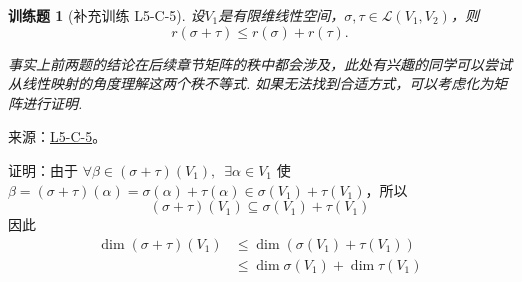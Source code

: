 \documentclass[UTF8,12pt,a4paper,fontset=fandol]{ctexart}
\newtheorem{exercise}{训练题}[section]
\begin{document}
\begin{exercise}[补充训练 L5-C-5]\label{prob:L5-C-5}
设$V_1$是有限维线性空间，$\sigma,\tau\in \mathcal{L}(V_1,V_2)$，则
        \[r(\sigma+\tau) \leqslant r(\sigma)+r(\tau).\]

        事实上前两题的结论在后续章节矩阵的秩中都会涉及，此处有兴趣的同学可以尝试从线性映射的角度理解这两个秩不等式. 如果无法找到合适方式，可以考虑化为矩阵进行证明.
\end{exercise}
\noindent 来源：\href{https://github.com/yhwu-is/Linear-Algebra-Left-Undone/blob/new/%E8%AE%B2%E4%B9%89/%E4%B8%93%E9%A2%98/5%20%E7%BA%BF%E6%80%A7%E6%98%A0%E5%B0%84.tex}{L5-C-5}。
\begin{solve}
证明：由于 $ \forall \beta \in (\sigma + \tau)(V_1),\enspace \exists \alpha \in V_1 $ 使 $ \beta = (\sigma + \tau)(\alpha) = \sigma(\alpha) + \tau(\alpha) \in \sigma(V_1) + \tau(V_1) $，所以
          \[ (\sigma + \tau)(V_1) \subseteq \sigma(V_1) + \tau(V_1) \]
          因此
          \begin{align*}
              \dim(\sigma + \tau)(V_1) & \leqslant \dim(\sigma(V_1) + \tau(V_1))     \\
                                       & \leqslant \dim \sigma(V_1) + \dim \tau(V_1)
          \end{align*}
\end{solve}
\end{document}
